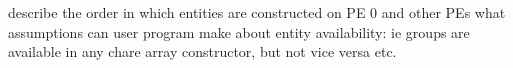 describe the order in which entities are constructed on PE 0 and other PEs
what assumptions can user program make about entity availability:
ie groups are available in any chare array constructor, but not vice versa etc.


